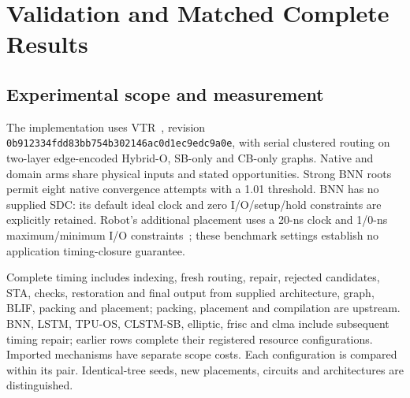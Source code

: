 \documentclass[conference,10pt]{IEEEtran}
\begin{document}
\section{Validation and Matched Complete Results}
\subsection{Experimental scope and measurement}
The implementation uses VTR~\cite{vtr9paper}, revision \texttt{0b912334fdd83bb754b302146ac0d1ec9edc9a0e}, with serial clustered routing on two-layer edge-encoded Hybrid-O, SB-only and CB-only graphs. Native and domain arms share physical inputs and stated opportunities. Strong BNN roots permit eight native convergence attempts with a 1.01 threshold. BNN has no supplied SDC: its default ideal clock and zero I/O/setup/hold constraints are explicitly retained. Robot's additional placement uses a 20-ns clock and 1/0-ns maximum/minimum I/O constraints~\cite{vprsdc}; these benchmark settings establish no application timing-closure guarantee.

Complete timing includes indexing, fresh routing, repair, rejected candidates, STA, checks, restoration and final output from supplied architecture, graph, BLIF, packing and placement; packing, placement and compilation are upstream. BNN, LSTM, TPU-OS, CLSTM-SB, elliptic, frisc and clma include subsequent timing repair; earlier rows complete their registered resource configurations. Imported mechanisms have separate scope costs. Each configuration is compared within its pair. Identical-tree seeds, new placements, circuits and architectures are distinguished.
\end{document}
